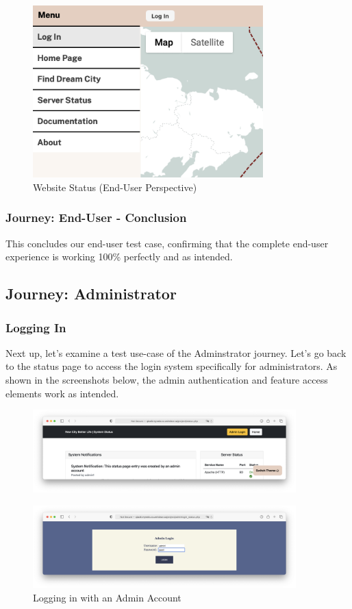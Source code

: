 \documentclass[12pt, letterpaper]{article}
\begin{document}
\begin{figure}[htbp]
\centering
\includegraphics[width=3.5in]{images/30-journey-e10b.png}
\caption{Website Status (End-User Perspective)}
\end{figure}

 \subsubsection*{Journey: End-User - Conclusion}
This concludes our end-user test case, confirming that the complete end-user experience is working 100\% perfectly and as intended.

 \newpage
\subsection*{Journey: Administrator}
\subsubsection*{Logging In}
Next up, let's examine a test use-case of the Adminstrator journey. Let's go back to the status page to access the login system specifically for administrators. As shown in the screenshots below, the admin authentication and feature access elements work as intended.

\begin{figure}[htbp]
\centering
\includegraphics[width=4in]{images/30-journey-a01a.png}
\end{figure}

\begin{figure}[htbp]
\centering
\includegraphics[width=4in]{images/30-journey-a01b.png}
\caption{Logging in with an Admin Account}
\end{figure}
\end{document}
